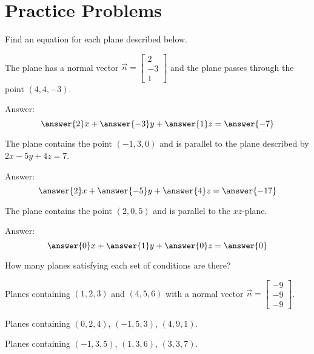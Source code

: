 \documentclass{ximera}
\begin{document}
\section{Practice Problems}

\begin{problem}
Find an equation for each plane described below.

  \begin{problem}
  The plane has a normal vector $\vec{n}=\begin{bmatrix}2\\-3\\1\end{bmatrix}$ and the plane passes through the point $(4, 4, -3)$.
  
  Answer: $$\answer{2}x+\answer{-3}y+\answer{1}z=\answer{-7}$$
  \end{problem}
  
  \begin{problem}
  The plane contains the point $(-1, 3, 0)$ and is parallel to the plane described by $2x-5y+4z=7$.
  
  Answer:
  $$\answer{2}x+\answer{-5}y+\answer{4}z=\answer{-17}$$
  \end{problem}
  
  \begin{problem}
  The plane contains the point $(2, 0, 5)$ and is parallel to the $xz$-plane.
  
  Answer:
  $$\answer{0}x+\answer{1}y+\answer{0}z=\answer{0}$$
  \end{problem}

\end{problem}

\begin{problem}
How many planes satisfying each set of conditions are there?

\begin{problem}
Planes containing $(1, 2, 3)$ and $(4, 5, 6)$ with a normal vector $\vec{n}=\begin{bmatrix}-9\\-9\\-9\end{bmatrix}$.
\begin{multipleChoice}
 \end{multipleChoice}
\end{problem}

\begin{problem}
Planes containing $(0,2, 4)$, $(-1, 5, 3)$, $(4, 9, 1)$.
\begin{multipleChoice}
 \end{multipleChoice}
\end{problem}

\begin{problem}
Planes containing $(-1, 3, 5)$, $(1, 3, 6)$, $(3, 3, 7)$.
\begin{multipleChoice}
 \end{multipleChoice}
\end{problem}

\end{problem}
\end{document}
